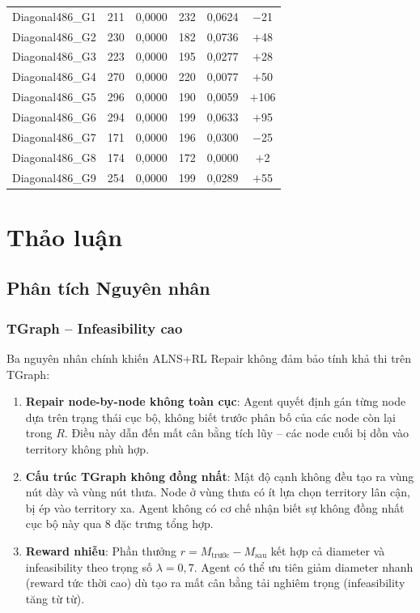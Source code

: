 \documentclass[12pt, a4paper]{article}
\begin{document}
\begin{longtable}{lccccc}
  Diagonal486\_G1 & 211 & 0{,}0000 & 232 & 0{,}0624 & $-$21 \\
  Diagonal486\_G2 & 230 & 0{,}0000 & 182 & 0{,}0736 & $+$48 \\
  Diagonal486\_G3 & 223 & 0{,}0000 & 195 & 0{,}0277 & $+$28 \\
  Diagonal486\_G4 & 270 & 0{,}0000 & 220 & 0{,}0077 & $+$50 \\
  Diagonal486\_G5 & 296 & 0{,}0000 & 190 & 0{,}0059 & $+$106 \\
  Diagonal486\_G6 & 294 & 0{,}0000 & 199 & 0{,}0633 & $+$95 \\
  Diagonal486\_G7 & 171 & 0{,}0000 & 196 & 0{,}0300 & $-$25 \\
  Diagonal486\_G8 & 174 & 0{,}0000 & 172 & 0{,}0000 & $+$2 \\
  Diagonal486\_G9 & 254 & 0{,}0000 & 199 & 0{,}0289 & $+$55 \\
\end{longtable}

\section{Thảo luận}
\label{sec:discussion}

\subsection{Phân tích Nguyên nhân}

\subsubsection{TGraph -- Infeasibility cao}

Ba nguyên nhân chính khiến ALNS+RL Repair không đảm bảo tính khả thi trên TGraph:

\begin{enumerate}
  \item \textbf{Repair node-by-node không toàn cục}: Agent quyết định gán từng
        node dựa trên trạng thái cục bộ, không biết trước phân bố của các node
        còn lại trong $R$. Điều này dẫn đến mất cân bằng tích lũy -- các node
        cuối bị dồn vào territory không phù hợp.

  \item \textbf{Cấu trúc TGraph không đồng nhất}: Mật độ cạnh không đều tạo ra
        vùng nút dày và vùng nút thưa. Node ở vùng thưa có ít lựa chọn territory
        lân cận, bị ép vào territory xa. Agent không có cơ chế nhận biết sự không
        đồng nhất cục bộ này qua 8 đặc trưng tổng hợp.

  \item \textbf{Reward nhiễu}: Phần thưởng $r = M_{\text{trước}} - M_{\text{sau}}$
        kết hợp cả diameter và infeasibility theo trọng số $\lambda = 0{,}7$.
        Agent có thể ưu tiên giảm diameter nhanh (reward tức thời cao) dù tạo ra
        mất cân bằng tải nghiêm trọng (infeasibility tăng từ từ).
\end{enumerate}
\end{document}
